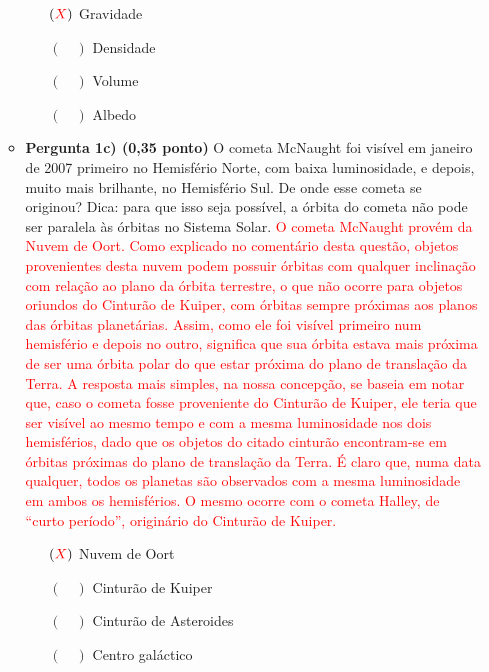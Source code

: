 \documentclass[a4paper, 12pt]{article}
\newcommand{\red}[1]{\textcolor{red}{#1}}
\begin{document}
\begin{flushleft}
\begin{itemize}
\begin{itemize}
\begin{itemize}
                            \item[$(\red{X})$] Gravidade
                            \item[$(\quad)$] Densidade
                            \item[$(\quad)$] Volume
                            \item[$(\quad)$] Albedo
                        \end{itemize}
                    \item \textbf{Pergunta 1c) (0,35 ponto)} O cometa McNaught foi visível em janeiro de 2007 primeiro no Hemisfério Norte, com baixa luminosidade, e depois, muito mais brilhante, no Hemisfério Sul. De onde esse cometa se originou? Dica: para que isso seja possível, a órbita do cometa não pode ser paralela às órbitas no Sistema Solar.
                        \linebreak \red{O  cometa  McNaught  provém  da  Nuvem  de  Oort.  Como  explicado  no  comentário  desta questão, objetos provenientes desta nuvem podem possuir órbitas com qualquer inclinação com relação ao plano da órbita terrestre, o que não ocorre para objetos oriundos do Cinturão de Kuiper, com órbitas sempre próximas aos planos das órbitas planetárias. Assim, como ele foi visível primeiro num hemisfério e depois no outro, significa que sua órbita estava mais próxima de ser uma órbita polar do  que  estar  próxima  do  plano  de  translação  da  Terra.  A  resposta  mais  simples, na nossa concepção, se baseia em notar que, caso o cometa  fosse  proveniente  do  Cinturão  de  Kuiper,  ele  teria  que  ser  visível  ao  mesmo  tempo  e  com  a  mesma  luminosidade  nos  dois hemisférios, dado que os objetos do citado cinturão encontram-se em órbitas próximas do plano de translação da Terra. É claro que, numa data qualquer, todos os planetas são observados com a mesma luminosidade em ambos os hemisférios. O mesmo ocorre com o cometa Halley, de “curto período”, originário do Cinturão de Kuiper.}
                        \begin{itemize}
                            \item[$(\red{X})$] Nuvem de Oort
                            \item[$(\quad)$] Cinturão de Kuiper
                            \item[$(\quad)$] Cinturão de Asteroides
                            \item[$(\quad)$] Centro galáctico
                        \end{itemize}
                \end{itemize}


\end{itemize}
\end{flushleft}
\end{document}
